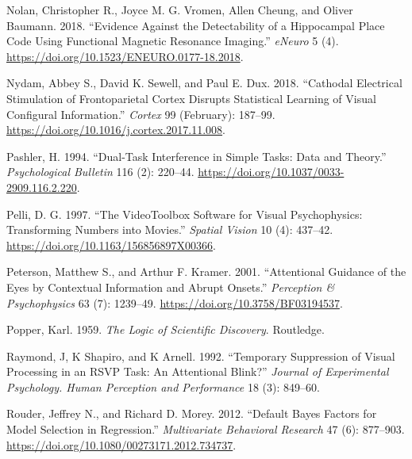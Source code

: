 \documentclass{article}
\newlength{\cslhangindent}
\newlength{\cslentryspacingunit} %
\newenvironment{CSLReferences}[2] %
 {%
  \setlength{\parindent}{0pt}
  \ifodd #1
  \let\oldpar\par
  \def\par{\hangindent=\cslhangindent\oldpar}
  \fi
  \setlength{\parskip}{#2\cslentryspacingunit}
 }%
 {}
\begin{document}
\begin{CSLReferences}{1}{0}
\leavevmode{}%
Nolan, Christopher R., Joyce M. G. Vromen, Allen Cheung, and Oliver Baumann. 2018. {``Evidence Against the {Detectability} of a {Hippocampal} {Place} {Code} {Using} {Functional} {Magnetic} {Resonance} {Imaging}.''} \emph{eNeuro} 5 (4). \url{https://doi.org/10.1523/ENEURO.0177-18.2018}.

\leavevmode{}%
Nydam, Abbey S., David K. Sewell, and Paul E. Dux. 2018. {``Cathodal Electrical Stimulation of Frontoparietal Cortex Disrupts Statistical Learning of Visual Configural Information.''} \emph{Cortex} 99 (February): 187--99. \url{https://doi.org/10.1016/j.cortex.2017.11.008}.

\leavevmode{}%
Pashler, H. 1994. {``Dual-Task Interference in Simple Tasks: Data and Theory.''} \emph{Psychological Bulletin} 116 (2): 220--44. \url{https://doi.org/10.1037/0033-2909.116.2.220}.

\leavevmode{}%
Pelli, D. G. 1997. {``The {VideoToolbox} Software for Visual Psychophysics: Transforming Numbers into Movies.''} \emph{Spatial Vision} 10 (4): 437--42. \url{https://doi.org/10.1163/156856897X00366}.

\leavevmode{}%
Peterson, Matthew S., and Arthur F. Kramer. 2001. {``Attentional Guidance of the Eyes by Contextual Information and Abrupt Onsets.''} \emph{Perception \& Psychophysics} 63 (7): 1239--49. \url{https://doi.org/10.3758/BF03194537}.

\leavevmode{}%
Popper, Karl. 1959. \emph{The {Logic} of {Scientific} {Discovery}}. Routledge.

\leavevmode{}%
Raymond, J, K Shapiro, and K Arnell. 1992. {``Temporary {Suppression} of {Visual} {Processing} in an {RSVP} {Task}: {An} {Attentional} {Blink}?''} \emph{Journal of Experimental Psychology. Human Perception and Performance} 18 (3): 849--60.

\leavevmode{}%
Rouder, Jeffrey N., and Richard D. Morey. 2012. {``Default {Bayes} {Factors} for {Model} {Selection} in {Regression}.''} \emph{Multivariate Behavioral Research} 47 (6): 877--903. \url{https://doi.org/10.1080/00273171.2012.734737}.


\end{CSLReferences}
\end{document}
